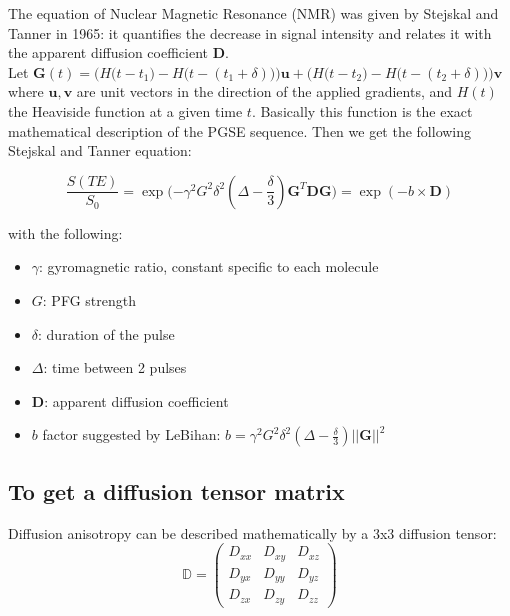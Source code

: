 The equation of Nuclear Magnetic Resonance (NMR) was given by Stejskal and Tanner in 1965: it quantifies the decrease in signal intensity and relates it with the apparent diffusion coefficient $\mathbf{D}$.\\
Let $\mathbf{G}(t) = \Big(H\big(t - t_1\big) - H\big(t - (t_1 + \delta)\big)\Big)\mathbf{u} + \Big(H\big(t - t_2\big) - H\big(t - (t_2 + \delta)\big)\Big) \mathbf{v}$ \\
where $\mathbf{u}, \mathbf{v}$ are unit vectors in the direction of the applied gradients, and $H(t)$ the Heaviside function at a given time $t$. Basically this function is the exact mathematical description of the PGSE sequence. Then we get the following Stejskal and Tanner equation:

\begin{equation} \label{eq:tanner}
\frac{S(TE)}{S_0} = \exp\Big({-\gamma^2G^2\delta^2(\Delta - \frac{\delta}{3})\mathbf{G}^T\mathbf{D}\mathbf{G}\Big)} = \exp (-b \times \mathbf{D})
\end{equation}

with the following:

\begin{itemize}
    \item $\gamma$: gyromagnetic ratio, constant specific to each molecule
    \item $G$: PFG strength
    \item $\delta$: duration of the pulse
    \item $\Delta$: time between 2 pulses
    \item $\mathbf{D}$: apparent diffusion coefficient
    \item $b$ factor suggested by LeBihan: $b = \gamma^2G^2\delta^2(\Delta - \frac{\delta}{3})||\mathbf{G}||^2$
\end{itemize}

\subsection{To get a diffusion tensor matrix}

Diffusion anisotropy can be described mathematically by a 3x3 diffusion tensor:
\begin{equation}
    \mathbb{D} = \begin{pmatrix}
    D_{xx} & D_{xy} & D_{xz} \\
    D_{yx} & D_{yy} & D_{yz} \\
    D_{zx} & D_{zy} & D_{zz}
    \end{pmatrix}
\end{equation}

